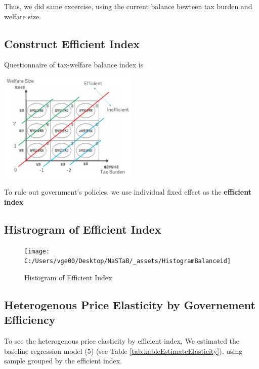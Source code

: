 \documentclass[ review  , 3p ]{elsarticle}
\begin{document}
  Thus, we did same excercise, using the current balance bewteen tax burden and welfare size.
  
  \hypertarget{construct-efficient-index}{%
  \subsection{Construct Efficient Index}\label{construct-efficient-index}}
  
  Questionnaire of tax-welfare balance index is
  
  \includegraphics[width=0.5\textwidth,height=\textheight]{_assets/BalanceQuestion.jpg}
  
  To rule out government's policies, we use individual fixed effect as the \textbf{efficient index}
  
  \hypertarget{histrogram-of-efficient-index}{%
  \subsection{Histrogram of Efficient Index}\label{histrogram-of-efficient-index}}
  
  \begin{figure}
  
  {\centering \texttt{[image: C:/Users/vge00/Desktop/NaSTaB/\_assets/HistogramBalanceid]} 
  
  }
  
  \caption{Histogram of Efficient Index}\label{fig:unnamed-chunk-1}
  \end{figure}
  
  \hypertarget{heterogenous-price-elasticity-by-governement-efficiency}{%
  \subsection{Heterogenous Price Elasticity by Governement Efficiency}\label{heterogenous-price-elasticity-by-governement-efficiency}}
  
  To see the heterogenous price elasticity by efficient index,
  We estimated the baseline regression model (5) (see Table \ref{tab:kableEstimateElasticity}),
  using sample grouped by the efficient index.
  
\end{document}
